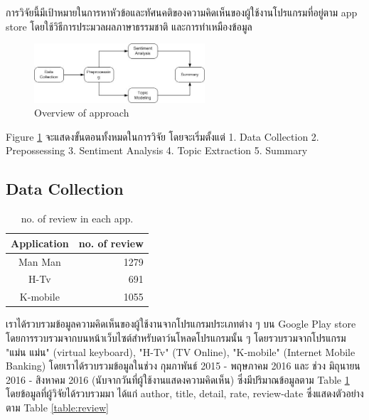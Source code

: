การวิจัยนี้มีเป้าหมายในการหาหัวข้อและทัศนคติของความคิดเห็นของผู้ใช้งานโปรแกรมที่อยู่ตาม app store โดยใช้วิธีการประมวลผลภาษาธรรมชาติ และการทำเหมืองข้อมูล
\begin{figure}[h]
	\centering
	\includegraphics[width=2.5in]{Process.jpg}
	\caption{Overview of approach}
	\label{fig:approachFig}
\end{figure}
Figure \ref{fig:approachFig} จะแสดงขั้นตอนทั้งหมดในการวิจัย โดยจะเริ่มตั้งแต่ 1. Data Collection 2. Prepossessing 3. Sentiment Analysis 4. Topic Extraction 5. Summary 
\subsection{Data Collection}

\begin{table}[h]
	\caption{no. of review in each app.}
	\label{table:NoOfReview}
	\centering
	\begin{tabular}{|c|r|}
		\hline
		Application & \multicolumn{1}{|c|}{no. of review} \\
		\hline
		Man Man & 1279\\
		\hline
		H-Tv & 691\\
		\hline
		K-mobile & 1055\\
		\hline
	\end{tabular}
\end{table}
เราได้รวบรวมข้อมูลความคิดเห็นของผู้ใช้งานจากโปรแกรมประเภทต่าง ๆ บน Google Play store โดยการรวบรวมจากบนหน้าเว็บไซต์สำหรับดาว์นโหลดโปรแกรมนั้น ๆ
โดยรวบรวมจากโปรแกรม "แม่น แม่น" (virtual keyboard), "H-Tv" (TV Online), "K-mobile" (Internet Mobile Banking) โดยเราได้รวบรวมข้อมูลในช่วง กุมภาพันธ์ 2015 - พฤษภาคม 2016 และ ช่วง มิถุนายน 2016 - สิงหาคม 2016 (นับจากวันที่ผู้ใช้งานแสดงความคิดเห็น) ซึ่งมีปริมาณข้อมูลตาม Table \ref{table:NoOfReview} โดยข้อมูลที่ผู้วิจัยได้รวบรวมมา ได้แก่ author, title, detail, rate, review-date ซึ่งแสดงตัวอย่างตาม Table \ref{table:review}

